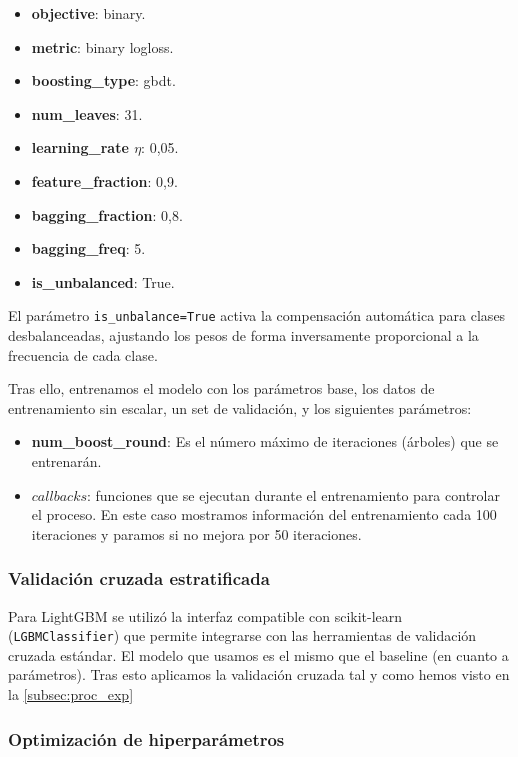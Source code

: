 \begin{itemize}
	\item \textbf{objective}: binary.
	\item \textbf{metric}: binary logloss.
	\item \textbf{boosting\_type}: gbdt.
	\item \textbf{num\_leaves}: 31.
	\item \textbf{learning\_rate \(\eta\)}: 0,05.
	\item \textbf{feature\_fraction}: 0,9.
	\item \textbf{bagging\_fraction}: 0,8.
	\item \textbf{bagging\_freq}: 5.
	\item \textbf{is\_unbalanced}: True.
\end{itemize}

El parámetro \texttt{is\_unbalance=True} activa la compensación automática para clases desbalanceadas, ajustando los pesos de forma inversamente proporcional a la frecuencia de cada clase. 

Tras ello, entrenamos el modelo con los parámetros base, los datos de entrenamiento sin escalar, un set de validación, y los siguientes parámetros:

\begin{itemize}
	\item \textbf{num\_boost\_round}: Es el número máximo de iteraciones (árboles) que se entrenarán.
	\item \textbf{$callbacks$}: funciones que se ejecutan durante el entrenamiento para controlar el proceso. En este caso mostramos información del entrenamiento cada 100 iteraciones y paramos si no mejora por 50 iteraciones.
\end{itemize}

\subsubsection*{Validación cruzada estratificada}

Para LightGBM se utilizó la interfaz compatible con scikit-learn (\texttt{LGBMClassifier}) que permite integrarse con las herramientas de validación cruzada estándar. El modelo que usamos es el mismo que el baseline (en cuanto a parámetros). Tras esto aplicamos la validación cruzada tal y como hemos visto en la \autoref{subsec:proc_exp}

\subsubsection*{Optimización de hiperparámetros}

